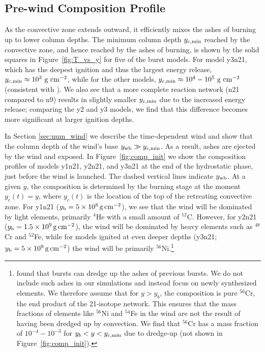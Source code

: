 \documentclass[apj,usenatbib, iop, twocolappendix]{emulateapj}
\newcommand{\trm}[1]{\textrm{#1}}
\begin{document}
\subsection{Pre-wind Composition Profile}
\label{sec:composition_hse}



As the convective zone extends outward, it efficiently mixes the ashes of burning up to lower column depths.  The minimum column depth $y_{c, \rm min}$ reached by the convective zone, and hence reached by the ashes of burning, is shown by the solid squares in Figure~\ref{fig:T_vs_y} for five of the burst models.  For model y3n21, which has the deepest ignition and thus the largest energy release, $y_{c,\rm min}\approx 10^3\trm{ g cm}^{-2}$, while for the other models, $y_{c, \rm min}\approx 10^4-10^5\trm{ g cm}^{-2}$ (consistent with  ).  We also see that a more complete reaction network (n21 compared to n9) results in slightly smaller $y_{c, \rm min}$ due to the increased energy release; comparing the y2 and y3 models, we find that this difference becomes more significant at larger ignition depths.

In Section \ref{sec:num_wind} we describe the time-dependent wind and show that  the column depth of the wind's base $y_{\rm wb} \gg y_{c, \rm min}$. As a result, ashes are ejected by the wind and exposed.  In Figure~\ref{fig:comp_init} we show the composition profiles of models y1n21, y2n21, and y3n21 at the end of the hydrostatic phase, just before the wind is launched. 
The dashed vertical lines indicate $y_{\rm wb}$.  At a given $y$, the composition is determined by the burning stage at the moment $y_c(t)=y$, where $y_c(t)$ is the location of the top of the retreating convective zone.   
For y1n21 ($y_{\rm b}=5\times10^8\,{\rm g\,cm^{-2}}$), we see that the wind will be dominated by light elements, primarily $^{4}$He with a small amount of $^{12}$C.
However, for y2n21 ($y_{\rm b}=1.5\times10^9\,{\rm g\,cm^{-2}}$), the wind will be dominated by heavy elements such as $^{48}$Cr and $^{52}$Fe, while for models ignited at even deeper depths (y3n21; $y_{\rm b}=5\times10^9\,{\rm g\,cm^{-2}}$)  the wind will be primarily $^{56}$Ni.\footnote{\cite{Woosley:04} found that bursts can dredge up the ashes of previous bursts. We do not include such ashes in our simulations and instead focus on newly synthesized elements. We therefore assume that for $y>y_b$, the composition is pure $^{56}$Cr, the end product of the 21-isotope network.  This ensures that the mass fractions of elements like $^{56}$Ni and $^{54}$Fe in the wind are  not the result of having been dredged up by convection.  We find that  $^{56}$Cr has a mass fraction of $10^{-4}-10^{-3}$ for $y_b<y<y_{c, {\rm min}}$ due to dredge-up (not shown in Figure~\ref{fig:comp_init}).\label{fn:dredgeup}} 
\end{document}
